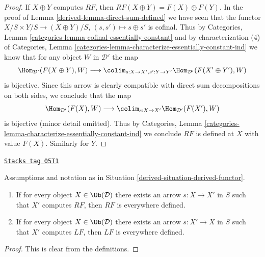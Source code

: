 \begin{proof}

If $X \oplus Y$ computes $RF$, then $RF(X \oplus Y) = F(X) \oplus F(Y)$.
In the proof of Lemma \ref{derived-lemma-direct-sum-defined} we have seen that
the functor $X/S \times Y/S \to (X \oplus Y)/S$, $(s, s') \mapsto s \oplus s'$
is cofinal. Thus by Categories, Lemma
\ref{categories-lemma-cofinal-essentially-constant} and by
characterization (4) of Categories, Lemma
\ref{categories-lemma-characterize-essentially-constant-ind}
we know that for any object $W$ in $\mathcal{D}'$ the map
$$
\Hom_{\mathcal{D}'}(F(X \oplus Y), W)
\longrightarrow
\colim_{s : X \to X', s' : Y \to Y'} \Hom_{\mathcal{D}'}(F(X' \oplus Y'), W)
$$
is bijective. Since this arrow is clearly compatible with direct sum
decompositions on both sides, we conclude that the map
$$
\Hom_{\mathcal{D}'}(F(X), W)
\longrightarrow
\colim_{s : X \to X'} \Hom_{\mathcal{D}'}(F(X'), W)
$$
is bijective (minor detail omitted). Thus by
Categories, Lemma \ref{categories-lemma-characterize-essentially-constant-ind}
we conclude $RF$ is defined at $X$ with value $F(X)$.
Similarly for $Y$.
\end{proof}

\begin{lemma}
\label{derived-lemma-existence-computes}
\href{https://stacks.math.columbia.edu/tag/05T1}{\texttt{Stacks tag 05T1}}

Assumptions and notation as in
Situation \ref{derived-situation-derived-functor}.
\begin{enumerate}
\item If for every object $X \in \Ob(\mathcal{D})$
there exists an arrow $s : X \to X'$ in $S$ such that $X'$ computes
$RF$, then $RF$ is everywhere defined.
\item If for every object $X \in \Ob(\mathcal{D})$
there exists an arrow $s : X' \to X$ in $S$ such that $X'$ computes
$LF$, then $LF$ is everywhere defined.
\end{enumerate}
\end{lemma}

\begin{proof}
This is clear from the definitions.
\end{proof}

